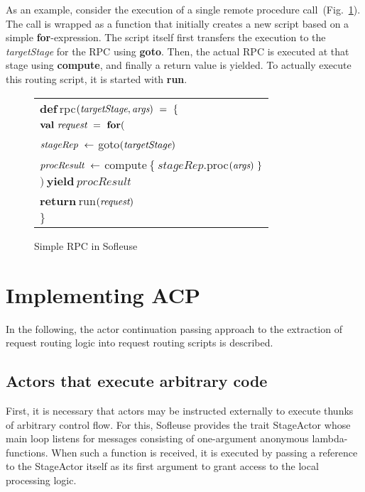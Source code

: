 \documentclass{sig-alternate}
\begin{document}
As an example, consider the execution of a single remote procedure call~(Fig.~\ref{fig:rpc}). The
call is wrapped as a function that initially creates a new script based on a simple
\textbf{for}-expression. The script itself first transfers the execution to the \emph{targetStage}
for the RPC using \textbf{goto}. Then, the actual RPC is executed at that stage using
\textbf{compute}, and finally a return value is yielded. To actually execute this routing script, it
is started with \textbf{run}.

\begin{figure}
\centering    
\begin{tabular}{l}           
$\textbf{def}\ $rpc$(\emph{targetStage}, \emph{args})\ =\ \{$\\	
\hspace{2ex} $\textbf{val}\ \emph{request}\ =\ \textbf{for} ($\\
\hspace{6ex} $\emph{stageRep}\ \leftarrow\ $goto$(\emph{targetStage})$\\
\hspace{6ex} $\emph{procResult}\ \leftarrow\ $compute$\ \{\ stageRep.$proc$(\emph{args})\ \}$\\
\hspace{2ex} $)\ \textbf{yield}\ procResult$\\
\hspace{2ex} $\textbf{return}\ $run$(\emph{request})$\\   
$\}$\\
\end{tabular}
\caption{Simple RPC in Sofleuse\label{fig:rpc}}
\end{figure}


\section{Implementing ACP}

In the following, the actor continuation passing approach to the extraction of request routing logic
into request routing scripts is described.
                             

\subsection{Actors that execute arbitrary code} 

First, it is necessary that actors may be instructed externally to execute thunks of arbitrary
control flow. For this, Sofleuse provides the trait StageActor whose main loop listens for messages
consisting of one-argument anonymous lambda-functions. When such a function is received, it is
executed by passing a reference to the StageActor itself as its first argument to grant access to 
the local processing logic.
\end{document}
